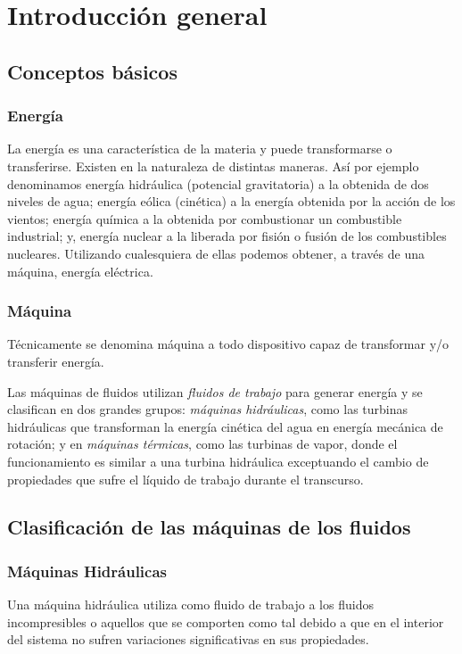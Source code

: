	\section{Introducción general}

\vspace{-.5cm}

\subsection{Conceptos básicos}

\subsubsection{Energía} La energía es una característica de la materia y puede transformarse o transferirse. Existen en la naturaleza de distintas maneras.
Así por ejemplo denominamos energía hidráulica (potencial gravitatoria) a la obtenida de dos niveles de agua; energía eólica (cinética) a la energía obtenida por la acción de los vientos; energía química a la obtenida por combustionar un combustible industrial; y, energía nuclear a la liberada por fisión o fusión de los combustibles nucleares. Utilizando cualesquiera de ellas podemos obtener, a través de una máquina, energía eléctrica.

\subsubsection{Máquina} 

Técnicamente se denomina máquina a todo dispositivo capaz de transformar y/o transferir energía.



Las máquinas de fluidos utilizan \textsl{fluidos de trabajo} para generar energía y se clasifican en dos grandes grupos: \textsl{máquinas hidráulicas}, como las turbinas hidráulicas que transforman la energía cinética del agua en energía mecánica de rotación; y en \textsl{máquinas térmicas}, como las turbinas de vapor, donde el funcionamiento es similar a una turbina hidráulica exceptuando el cambio de propiedades que sufre el líquido de trabajo durante el transcurso.

\subsection{Clasificación de las máquinas de los fluidos}


\subsubsection{Máquinas Hidráulicas} Una máquina hidráulica utiliza como fluido de trabajo a los fluidos incompresibles o aquellos que se comporten como tal debido a que en el interior del sistema no sufren variaciones significativas en sus propiedades.
